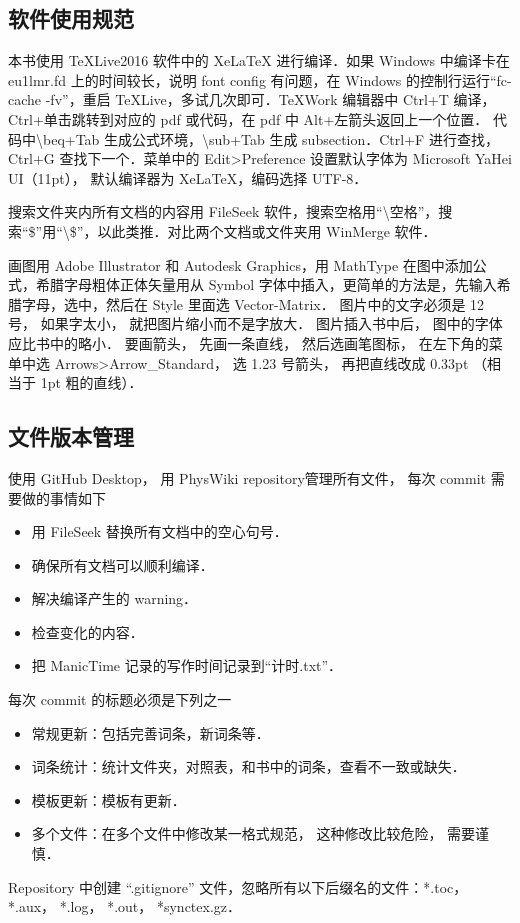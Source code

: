 

\subsection{软件使用规范}

本书使用 TeXLive2016 软件中的 XeLaTeX 进行编译．如果 Windows 中编译卡在 eu1lmr.fd 上的时间较长，说明 font config 有问题，在 Windows 的控制行运行“fc-cache -fv”，重启 TeXLive，多试几次即可．TeXWork 编辑器中 Ctrl+T 编译，Ctrl+单击跳转到对应的 pdf 或代码，在 pdf 中 Alt+左箭头返回上一个位置． 代码中\textbackslash beq+Tab 生成公式环境，\textbackslash sub+Tab 生成 subsection．Ctrl+F 进行查找，Ctrl+G 查找下一个．菜单中的 Edit>Preference 设置默认字体为 Microsoft YaHei UI（11pt）， 默认编译器为 XeLaTeX，编码选择 UTF-8．

搜索文件夹内所有文档的内容用 FileSeek 软件，搜索空格用“\textbackslash 空格”，搜索“\$”用“\textbackslash \$”，以此类推．对比两个文档或文件夹用 WinMerge 软件．

画图用 Adobe Illustrator 和 Autodesk Graphics，用 MathType 在图中添加公式，希腊字母粗体正体矢量用从 Symbol 字体中插入，更简单的方法是，先输入希腊字母，选中，然后在 Style 里面选 Vector-Matrix． 图片中的文字必须是 12 号， 如果字太小， 就把图片缩小而不是字放大． 图片插入书中后， 图中的字体应比书中的略小． 要画箭头， 先画一条直线， 然后选画笔图标， 在左下角的菜单中选 Arrows>Arrow\_Standard， 选 1.23 号箭头， 再把直线改成 0.33pt （相当于 1pt 粗的直线）．

\subsection{文件版本管理}
使用 GitHub Desktop， 用 PhysWiki repository管理所有文件， 每次 commit 需要做的事情如下
\begin{itemize}
\item 用 FileSeek 替换所有文档中的空心句号．
\item 确保所有文档可以顺利编译．
\item 解决编译产生的 warning．
\item 检查变化的内容．
\item 把 ManicTime 记录的写作时间记录到“计时.txt”．
\end{itemize}
每次 commit 的标题必须是下列之一
\begin{itemize}
\item 常规更新：包括完善词条，新词条等．
\item 词条统计：统计文件夹，对照表，和书中的词条，查看不一致或缺失．
\item 模板更新：模板有更新．
\item 多个文件：在多个文件中修改某一格式规范， 这种修改比较危险， 需要谨慎．
\end{itemize}
Repository 中创建 “.gitignore” 文件，忽略所有以下后缀名的文件：*.toc， *.aux， *.log， *.out， *synctex.gz．


